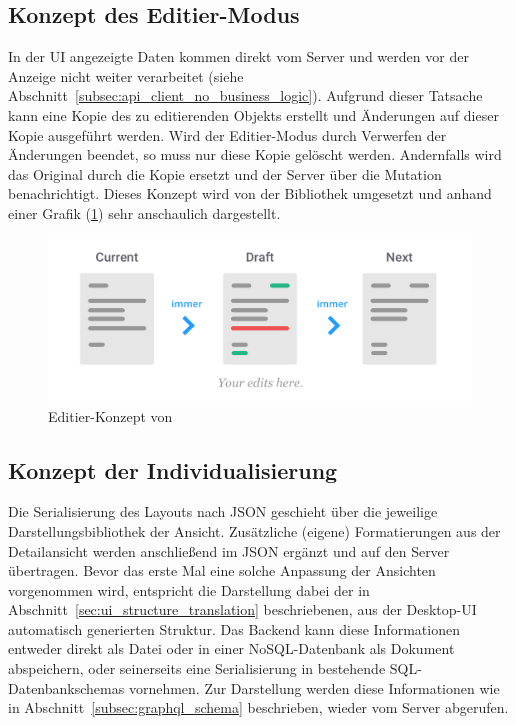 \subsection{Konzept des Editier-Modus}
In der UI angezeigte Daten kommen direkt vom Server und werden vor der Anzeige nicht weiter verarbeitet (siehe Abschnitt~\ref{subsec:api_client_no_business_logic}). Aufgrund dieser Tatsache kann eine Kopie des zu editierenden Objekts erstellt und Änderungen auf dieser Kopie ausgeführt werden. Wird der Editier-Modus durch Verwerfen der Änderungen beendet, so muss nur diese Kopie gelöscht werden. Andernfalls wird das Original durch die Kopie ersetzt und der Server über die Mutation benachrichtigt. Dieses Konzept wird von der Bibliothek  \parencite{weststrate_2019} umgesetzt und anhand einer Grafik (\ref{fig:immer_draft_concept}) sehr anschaulich dargestellt.

\begin{figure}
    \centering
    \captionsetup{justification=centering}
    \includegraphics[width=\textwidth]{figures/immer_draft_concept.png}
        \caption{Editier-Konzept von  \parencite{weststrate_2019}}\label{fig:immer_draft_concept}
\end{figure}

\subsection{Konzept der Individualisierung}
Die Serialisierung des Layouts nach JSON geschieht über die jeweilige Darstellungsbibliothek der Ansicht. Zusätzliche (eigene) Formatierungen aus der Detailansicht werden anschließend im JSON ergänzt und auf den Server übertragen. Bevor das erste Mal eine solche Anpassung der Ansichten vorgenommen wird, entspricht die Darstellung dabei der in Abschnitt~\ref{sec:ui_structure_translation} beschriebenen, aus der Desktop-UI automatisch generierten Struktur. Das Backend kann diese Informationen entweder direkt als Datei oder in einer NoSQL-Datenbank als Dokument abspeichern, oder seinerseits eine Serialisierung in bestehende SQL-Datenbankschemas vornehmen. Zur Darstellung werden diese Informationen wie in Abschnitt~\ref{subsec:graphql_schema} beschrieben, wieder vom Server abgerufen.

